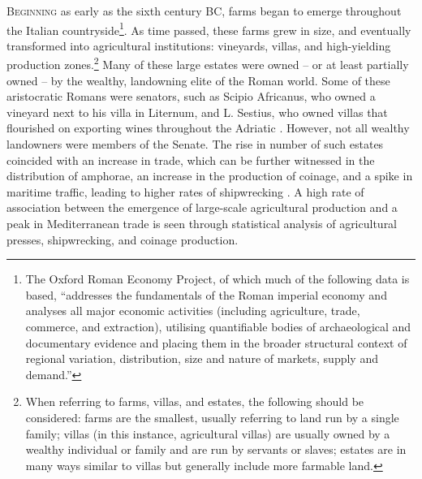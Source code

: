		
	

	\lettrine[nindent=0em,lines=3]{B}{eginning} as early as the sixth century BC, farms began to emerge throughout the Italian countryside\footnote{The Oxford Roman Economy Project, of which much of the following data is based, “addresses the fundamentals of the Roman imperial economy and analyses all major economic activities (including agriculture, trade, commerce, and extraction), utilising quantifiable bodies of archaeological and documentary evidence and placing them in the broader structural context of regional variation, distribution, size and nature of markets, supply and demand.”}. As time passed, these farms grew in size, and eventually transformed into agricultural institutions: vineyards, villas, and high-yielding production zones.\footnote{When referring to farms, villas, and estates, the following should be considered: farms are the smallest, usually referring to land run by a single family; villas (in this instance, agricultural villas) are usually owned by a wealthy individual or family and are run by servants or slaves; estates are in many ways similar to villas but generally include more farmable land.} Many of these large estates were owned – or at least partially owned – by the wealthy, landowning elite of the Roman world. Some of these aristocratic Romans were senators, such as Scipio Africanus, who owned a vineyard next to his villa in Liternum, and L. Sestius, who owned villas that flourished on exporting wines throughout the Adriatic \parencite[6,16]{Purcell_1985}. However, not all wealthy landowners were members of the Senate. The rise in number of such estates coincided with an increase in trade, which can be further witnessed in the distribution of amphorae, an increase in the production of coinage, and a spike in maritime traffic, leading to higher rates of shipwrecking \parencites{Manacorda_1978}{Hopkins_1980}. A high rate of association between the emergence of large-scale agricultural production and a peak in Mediterranean trade is seen through statistical analysis of agricultural presses, shipwrecking, and coinage production. 
	
